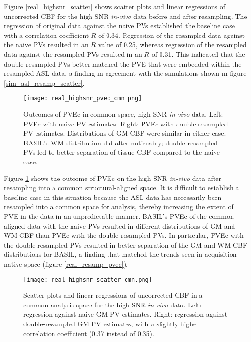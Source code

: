 Figure \ref{real_highsnr_scatter} shows scatter plots and linear regressions of uncorrected CBF for the high SNR \textit{in-vivo} data before and after resampling. The regression of original data against the naive PVs established the baseline case with a correlation coefficient $R$ of 0.34. Regression of the resampled data against the naive PVs resulted in an $R$ value of 0.25, whereas regression of the resampled data against the resampled PVs resulted in an $R$ of 0.31. This indicated that the double-resampled PVs better matched the PVE that were embedded within the resampled ASL data, a finding in agreement with the simulations shown in figure \ref{sim_asl_resamp_scatter}. 

\begin{figure}[H]
\centering
\texttt{[image: real\_highsnr\_pvec\_cmn.png]}
\caption{Outcomes of PVEc in common space, high SNR \textit{in-vivo} data. Left: PVEc with naive PV estimates. Right: PVEc with double-resampled PV estimates. Distributions of GM CBF were similar in either case. BASIL's WM distribution did alter noticeably;  double-resampled PVs led to better separation of tissue CBF compared to the naive case.}
\label{real_highsnr_pvec_cmn}
\end{figure}

Figure \ref{real_highsnr_pvec_cmn} shows the outcome of PVEc on the high SNR \textit{in-vivo} data after resampling into a common structural-aligned space. It is difficult to establish a baseline case in this situation because the ASL data has necessarily been resampled into a common space for analysis, thereby increasing the extent of PVE in the data in an unpredictable manner. BASIL's PVEc of the common aligned data with the naive PVs resulted in different distributions of GM and WM CBF than PVEc with the double-resampled PVs. In particular, PVEc with the double-resampled PVs resulted in better separation of the GM and WM CBF distributions for BASIL, a finding that matched the trends seen in acquisition-native space (figure \ref{real_resamp_pvec}).

\begin{figure}[H]
\centering
\texttt{[image: real\_highsnr\_scatter\_cmn.png]}
\caption{Scatter plots and linear regressions of uncorrected CBF in a common analysis space for the high SNR \textit{in-vivo} data. Left: regression against naive GM PV estimates. Right: regression against double-resampled GM PV estimates, with a slightly higher correlation coefficient (0.37 instead of 0.35).}
\label{real_highsnr_scatter_cmn}
\end{figure}

